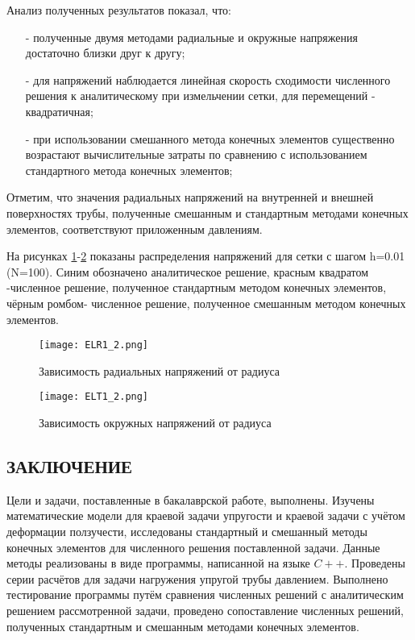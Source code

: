 \documentclass[a4paper,14pt]{extarticle}
\begin{document}
Анализ полученных результатов показал, что:
\begin{itemize}
\item[-]полученные двумя методами радиальные и окружные напряжения достаточно близки друг к другу;
\item[-]для напряжений наблюдается линейная скорость сходимости численного решения к аналитическому при измельчении сетки, для перемещений - квадратичная;
\item[-]при использовании смешанного метода конечных элементов существенно возрастают вычислительные затраты по сравнению с использованием стандартного метода конечных элементов;
\end{itemize}

Отметим, что значения радиальных напряжений на внутренней и внешней поверхностях трубы, полученные смешанным и стандартным методами конечных элементов, соответствуют приложенным давлениям. 

На рисунках \ref{1r}-\ref{1t} показаны распределения напряжений для сетки с шагом h=0.01 (N=100). Синим обозначено аналитическое решение, красным квадратом -численное решение, полученное стандартным методом конечных элементов, чёрным ромбом- численное решение, полученное смешанным методом конечных элементов. 

\newpage
\begin{figure}[h]
\begin{center}
\texttt{[image: ELR1\_2.png]}
\caption{Зависимость радиальных напряжений от радиуса}
\label{1r}
\end{center}
\end{figure}

\begin{figure}[h]
\begin{center}
\texttt{[image: ELT1\_2.png]}
\caption{Зависимость окружных напряжений от радиуса}
\label{1t}
\end{center}
\end{figure}

\newpage

\begin{center}
\section*{\centering ЗАКЛЮЧЕНИЕ}
\end{center}

Цели и задачи, поставленные в бакалаврской работе, выполнены. Изучены математические модели для краевой задачи упругости и краевой задачи с учётом деформации ползучести, исследованы стандартный и смешанный методы конечных элементов для численного решения поставленной задачи. Данные методы реализованы в виде программы, написанной на языке $C++$. Проведены серии расчётов для задачи нагружения упругой трубы давлением. Выполнено тестирование программы путём сравнения численных решений с аналитическим решением рассмотренной задачи, проведено сопоставление численных решений, полученных стандартным и смешанным методами конечных элементов. 
\end{document}
